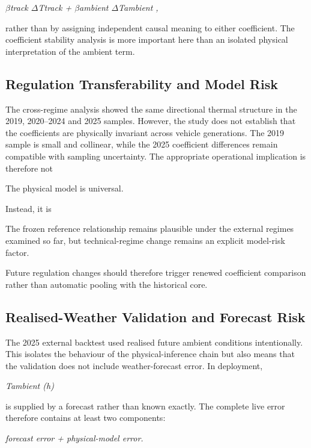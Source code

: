 \begin{center}\textit{\ensuremath{\beta}track \ensuremath{\Delta}Ttrack + \ensuremath{\beta}ambient \ensuremath{\Delta}Tambient ,}\end{center}

rather than by assigning independent causal meaning to either coefficient. The coefficient stability analysis is more important here than an isolated physical interpretation of the ambient term.

\subsection{Regulation Transferability and Model Risk}
The cross-regime analysis showed the same directional thermal structure in the 2019, 2020--2024 and 2025 samples. However, the study does not establish that the coefficients are physically invariant across vehicle generations. The 2019 sample is small and collinear, while the 2025 coefficient differences remain compatible with sampling uncertainty. The appropriate operational implication is therefore not

The physical model is universal.

Instead, it is

The frozen reference relationship remains plausible under the external regimes examined so far, but technical-regime change remains an explicit model-risk factor.

Future regulation changes should therefore trigger renewed coefficient comparison rather than automatic pooling with the historical core.

\subsection{Realised-Weather Validation and Forecast Risk}
The 2025 external backtest used realised future ambient conditions intentionally. This isolates the behaviour of the physical-inference chain but also means that the validation does not include weather-forecast error. In deployment,

\begin{center}\textit{Tambient (h)}\end{center}

is supplied by a forecast rather than known exactly. The complete live error therefore contains at least two components:

\begin{center}\textit{forecast error + physical-model error.}\end{center}

